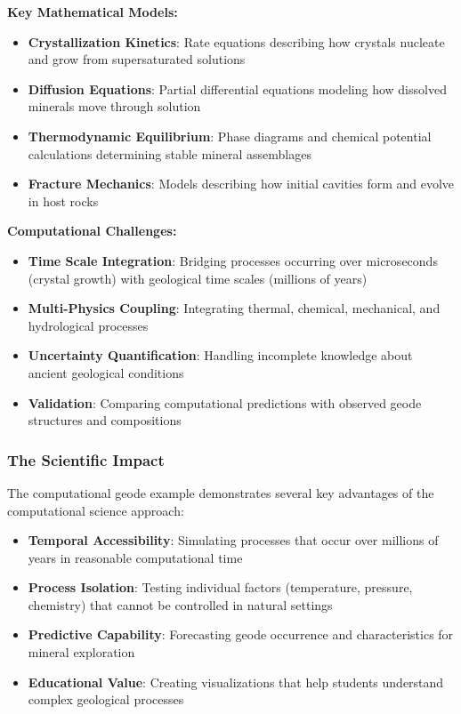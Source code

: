 \textbf{Key Mathematical Models:}
\begin{itemize}
    \item \textbf{Crystallization Kinetics}: Rate equations describing how crystals nucleate and grow from supersaturated solutions
    \item \textbf{Diffusion Equations}: Partial differential equations modeling how dissolved minerals move through solution
    \item \textbf{Thermodynamic Equilibrium}: Phase diagrams and chemical potential calculations determining stable mineral assemblages
    \item \textbf{Fracture Mechanics}: Models describing how initial cavities form and evolve in host rocks
\end{itemize}

\textbf{Computational Challenges:}
\begin{itemize}
    \item \textbf{Time Scale Integration}: Bridging processes occurring over microseconds (crystal growth) with geological time scales (millions of years)
    \item \textbf{Multi-Physics Coupling}: Integrating thermal, chemical, mechanical, and hydrological processes
    \item \textbf{Uncertainty Quantification}: Handling incomplete knowledge about ancient geological conditions
    \item \textbf{Validation}: Comparing computational predictions with observed geode structures and compositions
\end{itemize}

\subsubsection{The Scientific Impact}

The computational geode example demonstrates several key advantages of the computational science approach:

\begin{itemize}
    \item \textbf{Temporal Accessibility}: Simulating processes that occur over millions of years in reasonable computational time
    \item \textbf{Process Isolation}: Testing individual factors (temperature, pressure, chemistry) that cannot be controlled in natural settings
    \item \textbf{Predictive Capability}: Forecasting geode occurrence and characteristics for mineral exploration
    \item \textbf{Educational Value}: Creating visualizations that help students understand complex geological processes
\end{itemize}

